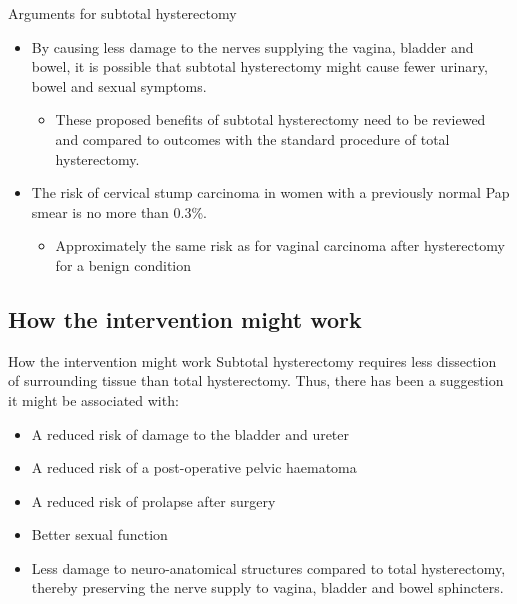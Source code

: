 \documentclass{beamer}
\begin{document}
\begin{frame}{Arguments for subtotal hysterectomy}
    \begin{itemize}
        \item By causing less damage to the nerves supplying the vagina,
              bladder and bowel, it is possible that subtotal hysterectomy
              might cause fewer urinary, bowel and sexual symptoms.
            \begin{itemize}
                \item These proposed benefits of subtotal hysterectomy need to
                      be reviewed and compared to outcomes with the standard
                      procedure of total hysterectomy.
            \end{itemize}
        \item The risk of cervical stump carcinoma in women with a previously normal Pap smear is no more than 0.3\%.
            \begin{itemize}
                \item Approximately the same risk as for vaginal carcinoma after hysterectomy for a benign condition
            \end{itemize}
    \end{itemize}
\end{frame}

\subsection{How the intervention might work}
\begin{frame}{How the intervention might work}
    Subtotal hysterectomy requires less dissection of surrounding tissue than
    total hysterectomy. Thus, there has been a suggestion it might be
    associated with:

    \begin{itemize}
        \item A reduced risk of damage to the bladder and ureter
        \item A reduced risk of a post-operative pelvic haematoma
        \item A reduced risk of prolapse after surgery
        \item Better sexual function
        \item Less damage to neuro-anatomical structures compared to
              total hysterectomy, thereby preserving the nerve supply to
              vagina, bladder and bowel sphincters.
    \end{itemize}
\end{frame}
\end{document}

